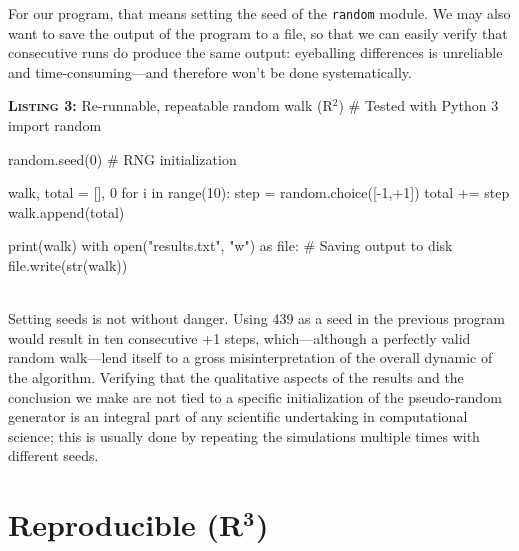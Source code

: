 \documentclass[a4paper,11pt]{article}
\begin{document}
For our program, that means setting the seed of the {\tt random} module. We may also want to save the output of the program to a file, so that we can easily verify that consecutive runs do produce the same output: eyeballing differences is unreliable and  time-consuming---and therefore won't be done systematically.\\

\noindent \begin{minipage}[c]{\linewidth}
\begin{code}{\textbf{\textsc{Listing 3:}} Re-runnable, repeatable random walk (R$^2$)}
# Tested with Python 3
import random

random.seed(0) # RNG initialization

walk, total = [], 0
for i in range(10):
    step = random.choice([-1,+1])
    total += step
    walk.append(total)

print(walk)
with open("results.txt", "w") as file: # Saving output to disk
    file.write(str(walk))
\end{code}
\end{minipage}\\

Setting seeds is not without danger. Using 439 as a seed in the previous program would result in ten consecutive +1 steps, which---although a perfectly valid random walk---lend itself to a gross misinterpretation of the overall dynamic of the algorithm. Verifying that the qualitative aspects of the results and the conclusion we make are not tied to a specific initialization of the pseudo-random generator is an integral part of any scientific undertaking in computational science;
this is usually done by repeating the simulations multiple times with different seeds.




\section*{Reproducible (R$^{\mathbf 3}$)}
\end{document}

